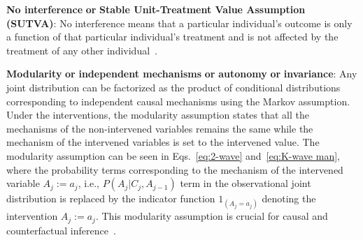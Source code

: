 \documentclass[letterpaper]{article} %
\begin{document}
\begin{inparaenum}[1.]
\item \textbf{No interference} \textbf{or} \textbf{Stable Unit-Treatment Value Assumption (SUTVA)}: No interference means that a particular individual's outcome is only a function of that particular individual's treatment and is not affected by the treatment of any other individual~\cite{cox1958planning}.

\item \textbf{Modularity} \textbf{or} \textbf{independent mechanisms} \textbf{or} \textbf{autonomy} \textbf{or} \textbf{invariance}: Any joint distribution can be factorized as the product of conditional distributions corresponding to independent causal mechanisms using the Markov assumption. 
Under the interventions, the modularity assumption states that all the mechanisms of the non-intervened variables remains the same while the mechanism of the intervened variables is set to the intervened value. 
The modularity assumption can be seen in Eqs.~\eqref{eq:2-wave} and~\eqref{eq:K-wave man}, where the probability terms corresponding to the mechanism of the intervened variable ${A_j}{ := }a_j$, i.e., $P(A_j|C_{j},A_{j-1})$ term in the observational joint distribution is replaced by the indicator function $1_{({A_j}{ = }a_j)}$ denoting the intervention ${A_j}{ := }a_j$.
This modularity assumption is crucial for causal and counterfactual inference~\cite{pearl2009abductionactionprediction, pearl2009causality, pearl2018bookofwhy}.
\end{inparaenum}



\end{document}
